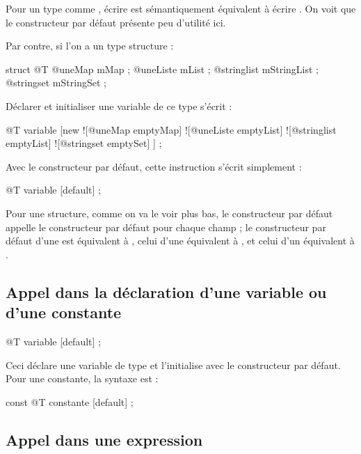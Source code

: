Pour un type comme , écrire  est sémantiquement équivalent à écrire . On voit que le constructeur par défaut présente peu d'utilité ici.

Par contre, si l'on a un type structure :

\begin{galgascode}
struct @T {
  @uneMap mMap ;
  @uneListe mList ;
  @stringlist mStringList ;
  @stringset mStringSet ;
}
\end{galgascode}

Déclarer et initialiser une variable de ce type s'écrit :

\begin{galgascode}
@T variable [new
  ![@uneMap emptyMap]
  ![@uneListe emptyList]
  ![@stringlist emptyList]
  ![@stringset emptySet]
] ;
\end{galgascode}

Avec le constructeur par défaut, cette instruction s'écrit simplement :

\begin{galgascode}
@T variable [default] ;
\end{galgascode}

Pour une structure, comme on va le voir plus bas, le constructeur par défaut appelle le constructeur par défaut pour chaque champ ; le constructeur par défaut d'une  est équivalent à , celui d'une   équivalent à , et celui d'un   équivalent à .


\subsection{Appel dans la déclaration d'une variable ou d'une constante}

\begin{galgascode}
@T variable [default] ;
\end{galgascode}

Ceci déclare une variable de type  et l'initialise avec le constructeur par défaut. Pour une constante, la syntaxe est :

\begin{galgascode}
const @T constante [default] ;
\end{galgascode}


\subsection{Appel dans une expression}

